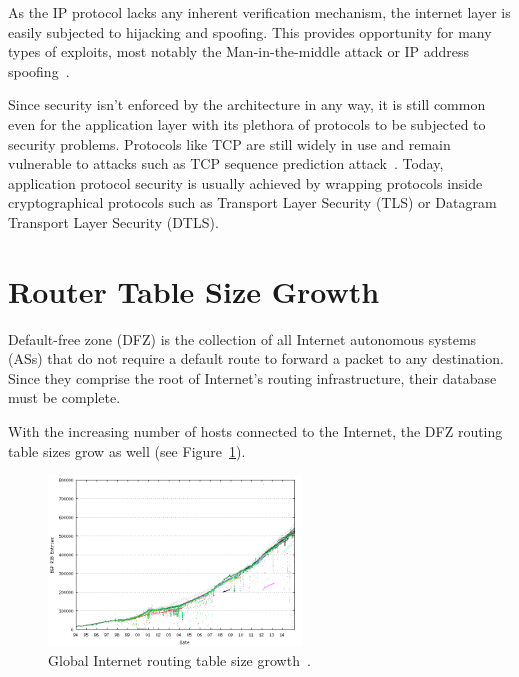         As the IP protocol lacks any inherent verification mechanism, the internet layer is easily subjected to hijacking and spoofing. This provides opportunity for many types of exploits, most notably the Man-in-the-middle attack or IP address spoofing~\cite{rfc1948}.

        Since security isn't enforced by the architecture in any way, it is still common even for the application layer with its plethora of protocols to be subjected to security problems. Protocols like TCP are still widely in use and remain vulnerable to attacks such as TCP sequence prediction attack~\cite{rfc1948}. Today, application protocol security is usually achieved by wrapping protocols inside cryptographical protocols such as Transport Layer Security (TLS) or Datagram Transport Layer Security (DTLS).

    \section{Router Table Size Growth}

        Default-free zone (DFZ) is the collection of all Internet autonomous systems (ASs) that do not require a default route to forward a packet to any destination. Since they comprise the root of Internet's routing infrastructure, their database must be complete.

        With the increasing number of hosts connected to the Internet, the DFZ routing table sizes grow as well (see Figure~\ref{fig:bgp-growth}).

        \begin{figure}[H]
            \begin{center}
                \includegraphics[width=0.6\textwidth]{fig/problems_bgp-growth.png}
              \caption{Global Internet routing table size growth~\cite{bgpgrow}.}
              \label{fig:bgp-growth}
            \end{center}
        \end{figure}

